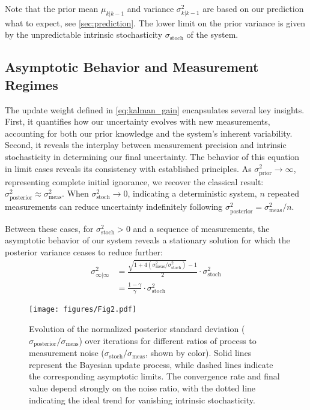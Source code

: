 \documentclass[9pt, twocolumn,superscriptaddress]{revtex4}
\begin{document}
Note that the prior mean $\mu_{k|k-1}$ and variance $\sigma^2_{k|k-1}$ are based on our prediction what to expect, see \cref{sec:prediction}. The lower limit on the prior variance is given by the unpredictable intrinsic stochasticity $\sigma_{\text{stoch}}$ of the system.



\subsection{Asymptotic Behavior and Measurement Regimes}\label{sec:steady-state}

The update weight defined in \cref{eq:kalman_gain} encapsulates several key insights. First, it quantifies how our uncertainty evolves with new measurements, accounting for both our prior knowledge and the system's inherent variability. Second, it reveals the interplay between measurement precision and intrinsic stochasticity in determining our final uncertainty.
The behavior of this equation in limit cases reveals its consistency with established principles. As $\sigma^2_{\text{prior}} \to \infty$, representing complete initial ignorance, we recover the classical result: $\sigma^2_{\text{posterior}} \approx \sigma^2_{\text{meas}}$. When $\sigma^2_{\text{stoch}} \to 0$, indicating a deterministic system, $n$ repeated measurements can reduce uncertainty indefinitely following $\sigma^2_{\text{posterior}} = \sigma^2_{\text{meas}}/n$. 

Between these cases, for $\sigma^2_{\text{stoch}} > 0$ and a sequence of measurements, the asymptotic behavior of our system reveals a stationary solution for which the posterior variance ceases to reduce further:
\begin{align}
    \sigma^2_{\infty|\infty} &=  \frac{\sqrt{1 + 4(\sigma^2_{\text{meas}}/\sigma^2_{\text{stoch}})} - 1}{2}  \cdot\sigma^2_{\text{stoch}} \nonumber \\
    &= \frac{1-\gamma}{\gamma}\cdot\sigma^2_{\text{stoch}} 
    \label{eq:posterior_variance}
\end{align}

\begin{figure}[t]
    \centering
    \texttt{[image: figures/Fig2.pdf]}
    \caption{Evolution of the normalized posterior standard deviation ($\sigma_\text{posterior}/\sigma_\text{meas}$) over iterations for different ratios of process to measurement noise ($\sigma_\text{stoch}/\sigma_\text{meas}$, shown by color). Solid lines represent the Bayesian update process, while dashed lines indicate the corresponding asymptotic limits. The convergence rate and final value depend strongly on the noise ratio, with the dotted line indicating the ideal trend for vanishing intrinsic stochasticity.}
    \label{fig:posterior_variance_evolution}
\end{figure}
\end{document}

